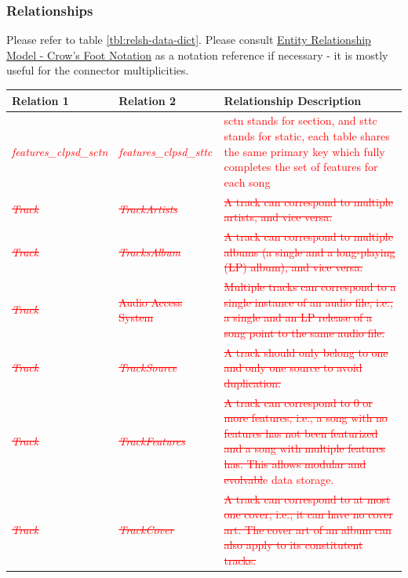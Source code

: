 \documentclass[12pt]{article}
\begin{document}
\subsubsection{Relationships}
Please refer to table \ref{tbl:relsh-data-dict}. Please consult \href{https://en.wikipedia.org/wiki/Entity%E2%80%93relationship_model#Crow's_foot_notation}{Entity Relationship Model - Crow's Foot Notation} as a notation reference if necessary - it is mostly useful for the connector multiplicities.
\begin{table}[htbp!]
  \centering
  \begin{tabular}{ p{.3\linewidth} || p{.3\linewidth} || p{.4\linewidth} }
    \textbf{Relation 1} & \textbf{Relation 2} & \textbf{Relationship Description} \\
    \toprule
    \textcolor{red}{\emph{features\_clpsd\_sctn}} & \textcolor{red}{\emph{features\_clpsd\_sttc}} & \textcolor{red}{sctn stands for section, and sttc stands for static, each table shares the same primary key which fully completes the set of features for each song} \\
    \textcolor{red}{\sout{\emph{Track}}} & \textcolor{red}{\sout{\emph{TrackArtists}}} & \textcolor{red}{\sout{A track can correspond to multiple artists, and vice versa.}} \\
    \textcolor{red}{\sout{\emph{Track}}} & \textcolor{red}{\sout{\emph{TracksAlbum}}} & \textcolor{red}{\sout{A track can correspond to multiple albums (a single and a long-playing (LP) album), and vice versa.}} \\
    \textcolor{red}{\sout{\emph{Track}}} & \textcolor{red}{\sout{Audio Access System}} & \textcolor{red}{\sout{Multiple tracks can correspond to a single instance of an audio file, i.e., a single and an LP release of a song point to the same audio file.}} \\
    \textcolor{red}{\sout{\emph{Track}}} & \textcolor{red}{\sout{\emph{TrackSource}}} & \textcolor{red}{\sout{A track should only belong to one and only one source to avoid duplication.}} \\
    \textcolor{red}{\sout{\emph{Track}}} & \textcolor{red}{\sout{\emph{TrackFeatures}}} & \textcolor{red}{\sout{A track can correspond to 0 or more features, i.e., a song with no features has not been featurized and a song with multiple features has. This allows modular and evolvabl}e data storage.} \\
    \textcolor{red}{\sout{\emph{Track}}} & \textcolor{red}{\sout{\emph{TrackCover}}} & \textcolor{red}{\sout{A track can correspond to at most one cover, i.e., it can have no cover art. The cover art of an album can also apply to its constitutent tracks.}} \\

\end{tabular}
\end{table}
\end{document}
